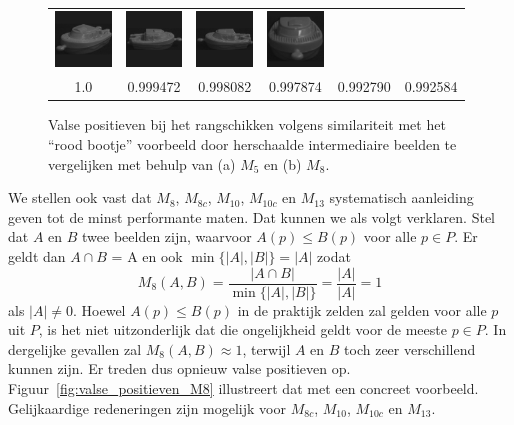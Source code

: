 \begin{figure}[tbp]
\begin{center}
{\begin{tabular}{cccccc}
\includegraphics[width=1.5cm]{coil/beeld-29.eps} &
\includegraphics[width=1.5cm]{coil/beeld-27.eps} &
\includegraphics[width=1.5cm]{coil/beeld-24.eps} &
\includegraphics[width=1.5cm]{coil/beeld-28.eps} \\
{\scriptsize 1.0} & 
{\scriptsize 0.999472} & 
{\scriptsize 0.998082} & 
{\scriptsize 0.997874} & 
{\scriptsize 0.992790} &
{\scriptsize 0.992584} 
\end{tabular}
\label{fig:valse_positieven_M8}
}
\caption{\label{fig:valse_positieven}Valse positieven bij het rangschikken volgens similariteit met 
het ``rood bootje'' voorbeeld door herschaalde intermediaire beelden te vergelijken met behulp van 
(a) $M_5$ en (b) $M_8$.}
\end{center}
\end{figure}

We stellen ook vast dat $M_8$, $M_{8c}$, $M_{10}$, $M_{10c}$ en $M_{13}$ systematisch aanleiding
geven tot de minst performante maten. Dat kunnen we als volgt verklaren. Stel dat $A$ en $B$
twee beelden zijn, waarvoor $A(p) \le B(p)$ voor alle
$p \in P$. Er geldt dan $A \cap B$ = A en ook $\min\{|A|,|B|\}=|A|$ zodat
$$
M_8(A,B)= \frac{|A \cap B|}{\min\{|A|,|B|\}} = \frac{|A|}{|A|} = 1
$$
als $|A| \ne 0$. Hoewel $A(p) \le B(p)$ in de praktijk zelden zal gelden voor alle $p$ uit $P$, 
is het niet uitzonderlijk dat die ongelijkheid geldt voor de meeste $p \in P$. In dergelijke 
gevallen zal $M_8(A,B) \approx 1$, terwijl $A$ en $B$ toch 
zeer verschillend kunnen zijn. Er treden dus opnieuw valse positieven op. Figuur~\ref{fig:valse_positieven_M8}
illustreert dat met een concreet voorbeeld. Gelijkaardige redeneringen zijn mogelijk voor $M_{8c}$, $M_{10}$, 
$M_{10c}$ en $M_{13}$.

